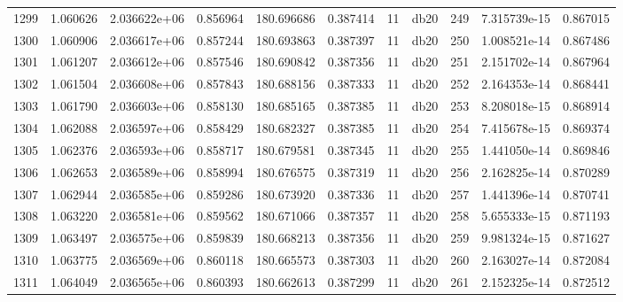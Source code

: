 \begin{tabular}{lrrrrrrlrrr}
1299 &    1.060626 &        2.036622e+06 &  0.856964 &              180.696686 &    0.387414 &      11 &         db20 &    249 &   7.315739e-15 &      0.867015 \\
1300 &    1.060906 &        2.036617e+06 &  0.857244 &              180.693863 &    0.387397 &      11 &         db20 &    250 &   1.008521e-14 &      0.867486 \\
1301 &    1.061207 &        2.036612e+06 &  0.857546 &              180.690842 &    0.387356 &      11 &         db20 &    251 &   2.151702e-14 &      0.867964 \\
1302 &    1.061504 &        2.036608e+06 &  0.857843 &              180.688156 &    0.387333 &      11 &         db20 &    252 &   2.164353e-14 &      0.868441 \\
1303 &    1.061790 &        2.036603e+06 &  0.858130 &              180.685165 &    0.387385 &      11 &         db20 &    253 &   8.208018e-15 &      0.868914 \\
1304 &    1.062088 &        2.036597e+06 &  0.858429 &              180.682327 &    0.387385 &      11 &         db20 &    254 &   7.415678e-15 &      0.869374 \\
1305 &    1.062376 &        2.036593e+06 &  0.858717 &              180.679581 &    0.387345 &      11 &         db20 &    255 &   1.441050e-14 &      0.869846 \\
1306 &    1.062653 &        2.036589e+06 &  0.858994 &              180.676575 &    0.387319 &      11 &         db20 &    256 &   2.162825e-14 &      0.870289 \\
1307 &    1.062944 &        2.036585e+06 &  0.859286 &              180.673920 &    0.387336 &      11 &         db20 &    257 &   1.441396e-14 &      0.870741 \\
1308 &    1.063220 &        2.036581e+06 &  0.859562 &              180.671066 &    0.387357 &      11 &         db20 &    258 &   5.655333e-15 &      0.871193 \\
1309 &    1.063497 &        2.036575e+06 &  0.859839 &              180.668213 &    0.387356 &      11 &         db20 &    259 &   9.981324e-15 &      0.871627 \\
1310 &    1.063775 &        2.036569e+06 &  0.860118 &              180.665573 &    0.387303 &      11 &         db20 &    260 &   2.163027e-14 &      0.872084 \\
1311 &    1.064049 &        2.036565e+06 &  0.860393 &              180.662613 &    0.387299 &      11 &         db20 &    261 &   2.152325e-14 &      0.872512 \\

\end{tabular}
